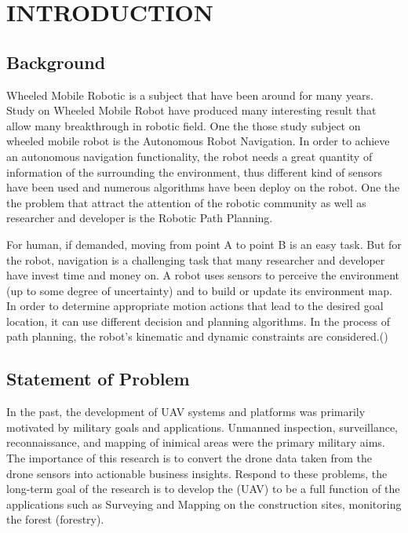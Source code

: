 \section{INTRODUCTION}
\subsection{Background}
\hspace{1.27cm}
Wheeled Mobile Robotic is a subject that have been around for many years. Study on Wheeled Mobile Robot have produced many interesting result that allow many breakthrough in robotic field. One the those study subject on wheeled mobile robot is the Autonomous Robot Navigation. In order to achieve an autonomous navigation functionality, the robot needs a great quantity of information of the surrounding the environment, thus different kind of sensors have been used and numerous algorithms have been deploy on the robot. One the the problem that attract the attention of the robotic community as well as researcher and developer is the Robotic Path Planning.\par
\hspace{1.27cm}
For human, if demanded, moving from point A to point B is an easy task. But for the robot, navigation is a challenging task that many researcher and developer have invest time and money on. A robot uses sensors to perceive the environment (up to some degree of uncertainty) and to build or update its environment map. In order to determine appropriate motion actions that lead to the desired goal location, it can use different decision and planning algorithms. In the process of path planning, the robot’s kinematic and dynamic constraints are considered.(\cite{KLANCAR2017161})
\subsection{Statement of Problem}
\hspace{1.27cm}
In the past, the development of UAV systems and platforms was primarily motivated by military goals and applications. Unmanned inspection, surveillance, reconnaissance, and mapping of inimical areas were the primary military aims.  The importance of this research is to convert the drone data taken from the drone sensors into actionable business insights. Respond to these problems, the long-term goal of the research is to develop the (UAV) to be a full function of the applications such as Surveying and Mapping on the construction sites, monitoring the forest (forestry).

